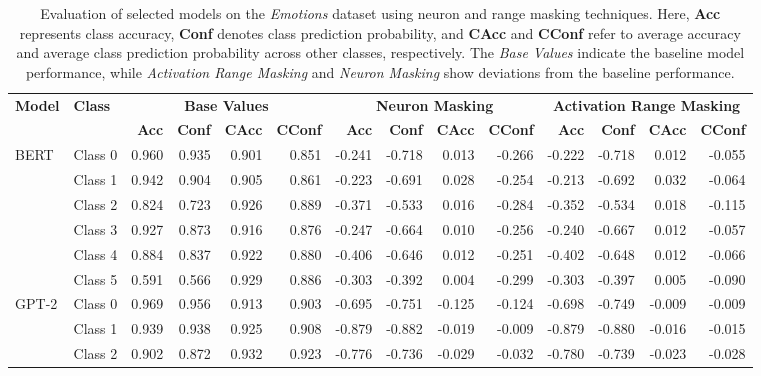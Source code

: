 \begin{table*}[t]
\caption{Evaluation of selected models on the \textit{Emotions} dataset using neuron and range masking techniques. Here, \textbf{Acc} represents class accuracy, \textbf{Conf} denotes class prediction probability, and \textbf{CAcc} and \textbf{CConf} refer to average accuracy and average class prediction probability across other classes, respectively. The \textit{Base Values} indicate the baseline model performance, while \textit{Activation Range Masking} and \textit{Neuron Masking} show deviations from the baseline performance.}
\centering
\scriptsize
\begin{tabular}{l|l|rrrr|rrrr|rrrr}
\toprule
\textbf{Model} & \textbf{Class} & \multicolumn{4}{c|}{\textbf{Base Values}} & \multicolumn{4}{c|}{\textbf{Neuron Masking}} & \multicolumn{4}{c}{\textbf{Activation Range Masking}} \\
\cmidrule(r){2-5} \cmidrule(r){6-9} \cmidrule{10-14}
&  & \textbf{Acc} & \textbf{Conf} & \textbf{CAcc} & \textbf{CConf} & \textbf{Acc} & \textbf{Conf} & \textbf{CAcc} & \textbf{CConf} & \textbf{Acc} & \textbf{Conf} & \textbf{CAcc} & \textbf{CConf} \\
\midrule
\multirow{6}{*}{BERT} 
&Class 0 & 0.960 & 0.935 & 0.901 & 0.851 & -0.241 & -0.718 & 0.013 & -0.266 & -0.222 & -0.718 & 0.012 & -0.055 \\
&Class 1 & 0.942 & 0.904 & 0.905 & 0.861 & -0.223 & -0.691 & 0.028 & -0.254 & -0.213 & -0.692 & 0.032 & -0.064 \\
&Class 2 & 0.824 & 0.723 & 0.926 & 0.889 & -0.371 & -0.533 & 0.016 & -0.284 & -0.352 & -0.534 & 0.018 & -0.115 \\
&Class 3 & 0.927 & 0.873 & 0.916 & 0.876 & -0.247 & -0.664 & 0.010 & -0.256 & -0.240 & -0.667 & 0.012 & -0.057 \\
&Class 4 & 0.884 & 0.837 & 0.922 & 0.880 & -0.406 & -0.646 & 0.012 & -0.251 & -0.402 & -0.648 & 0.012 & -0.066 \\
&Class 5 & 0.591 & 0.566 & 0.929 & 0.886 & -0.303 & -0.392 & 0.004 & -0.299 & -0.303 & -0.397 & 0.005 & -0.090 \\
\midrule
\multirow{6}{*}{GPT-2} 
&Class 0 & 0.969 & 0.956 & 0.913 & 0.903 & -0.695 & -0.751 & -0.125 & -0.124 & -0.698 & -0.749 & -0.009 & -0.009 \\
&Class 1 & 0.939 & 0.938 & 0.925 & 0.908 & -0.879 & -0.882 & -0.019 & -0.009 & -0.879 & -0.880 & -0.016 & -0.015 \\
&Class 2 & 0.902 & 0.872 & 0.932 & 0.923 & -0.776 & -0.736 & -0.029 & -0.032 & -0.780 & -0.739 & -0.023 & -0.028 \\

\end{tabular}
\end{table*}
